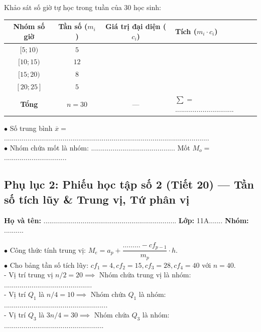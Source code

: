 \documentclass[12pt, a4paper]{article}
\begin{document}
\begin{pedabox}
Khảo sát số giờ tự học trong tuần của $30$ học sinh:
\begin{center}
\begin{tabularx}{0.95\linewidth}{|c|c|c|X|}
\hline
\textbf{Nhóm số giờ} & \textbf{Tần số ($m_i$)} & \textbf{Giá trị đại diện ($c_i$)} & \textbf{Tích ($m_i \cdot c_i$)} \\
\hline
$[5; 10)$ & $5$ & & \\
$[10; 15)$ & $12$ & & \\
$[15; 20)$ & $8$ & & \\
$[20; 25]$ & $5$ & & \\
\hline
\textbf{Tổng} & $n = 30$ & --- & $\sum = $ .............................. \\
\hline
\end{tabularx}
\end{center}
$\bullet$ Số trung bình $\overline{x} = $ .........................................................................................................\\[0.3em]
$\bullet$ Nhóm chứa mốt là nhóm: ........................................... Mốt $M_o = $ ................................
\end{pedabox}

\subsection*{Phụ lục 2: Phiếu học tập số 2 (Tiết 20) --- Tần số tích lũy \& Trung vị, Tứ phân vị}
\noindent\textbf{Họ và tên:} .................................................................... \textbf{Lớp:} 11A....... \textbf{Nhóm:} ..........

\begin{pedabox}
$\bullet$ Công thức tính trung vị: $M_e = a_p + \dfrac{\dots\dots\dots - cf_{p-1}}{m_p} \cdot h$.\\[0.3em]
$\bullet$ Cho bảng tần số tích lũy: $cf_1 = 4, cf_2 = 15, cf_3 = 28, cf_4 = 40$ với $n = 40$.\\
- Vị trí trung vị $n/2 = 20 \implies$ Nhóm chứa trung vị là nhóm: .............................................\\
- Vị trí $Q_1$ là $n/4 = 10 \implies$ Nhóm chứa $Q_1$ là nhóm: .....................................................\\
- Vị trí $Q_3$ là $3n/4 = 30 \implies$ Nhóm chứa $Q_3$ là nhóm: ...................................................
\end{pedabox}
\end{document}
